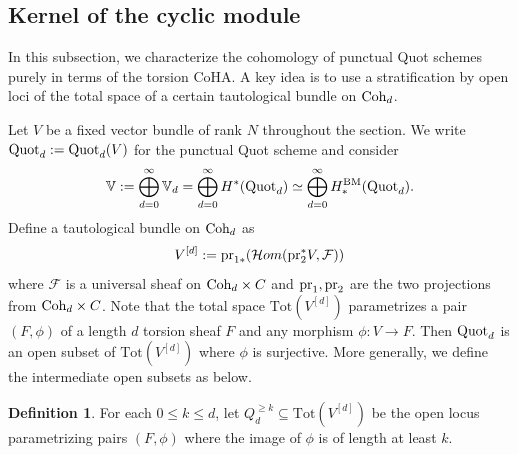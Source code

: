 \documentclass[10pt]{amsart}
\newcommand{\Tot}{\mathrm{Tot}}
\newcommand{\BV}{\mathbb{V}}
\newcommand{\CF}{\mathcal{F}}
\newcommand{\Quot}{\textnormal{Quot}}
\newcommand{\Coh}{\textnormal{Coh}}
\newcommand{\BM}{\textnormal{BM}}
\newcommand{\pr}{\textnormal{pr}}
\newcommand{\+}{{}^+}
\theoremstyle{definition}
\theoremstyle {definition}
\theoremstyle {definition}
\newtheorem{definition}[theorem]{Definition}
\begin{document}
\subsection{Kernel of the cyclic module}

In this subsection, we characterize the cohomology of punctual Quot schemes purely in terms of the torsion CoHA. A key idea is to use a stratification by open loci of the total space of a certain tautological bundle on $\Coh_d$. 

Let $V$ be a fixed vector bundle of rank $N$ throughout the section. We write $\Quot_d:=\Quot_d(V)$ for the punctual Quot scheme and consider 
$$\BV:=\bigoplus_{d=0}^\infty \BV_d=\bigoplus_{d=0}^\infty H^*(\Quot_d)\simeq \bigoplus_{d=0}^\infty H^\BM_*(\Quot_d). 
$$
Define a tautological bundle on $\Coh_d$ as
$$V^{[d]}:=\pr_{1*}(\mathcal{H}om(\pr_2^*V,\CF))$$ 
where $\CF$ is a universal sheaf on $\Coh_d\times C$ and $\pr_1, \pr_2$ are the two projections from $\Coh_d\times C$. Note that the total space $\Tot(V^{[d]})$ parametrizes a pair $(F,\phi)$ of a length $d$ torsion sheaf $F$ and any morphism $\phi:V\rightarrow F$. Then $\Quot_d$ is an open subset of $\Tot(V^{[d]})$ where $\phi$ is surjective. More generally, we define the intermediate open subsets as below.

\begin{definition}
For each $0\leq k\leq d$, let $Q_d^{\geq k}\subseteq \Tot(V^{[d]})$ be the open locus parametrizing pairs $(F,\phi)$ where the image of $\phi$ is of length at least $k$.  
\end{definition}
\end{document}
